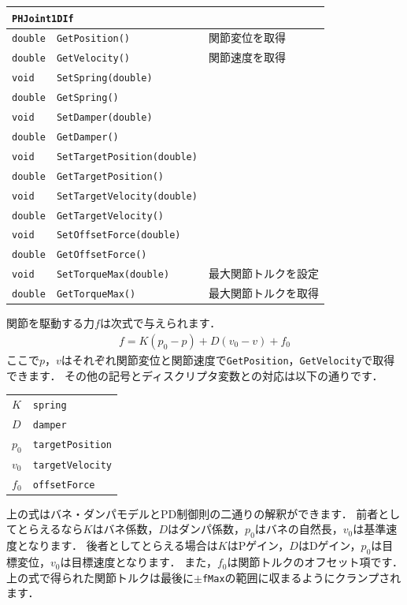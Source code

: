\begin{center}
\begin{longtable}{p{.15\hsize}p{.45\hsize}p{.30\hsize}}
\multicolumn{3}{l}{\texttt{PHJoint1DIf}}						\\ \midrule
\texttt{double}	& \texttt{GetPosition()}				& 関節変位を取得 \\
\texttt{double} & \texttt{GetVelocity()}				& 関節速度を取得 \\
\texttt{void} 	& \texttt{SetSpring(double)}			& \\
\texttt{double} & \texttt{GetSpring()}					& \\
\texttt{void} 	& \texttt{SetDamper(double)}			& \\
\texttt{double} & \texttt{GetDamper()}					& \\
\texttt{void} 	& \texttt{SetTargetPosition(double)}	& \\
\texttt{double} & \texttt{GetTargetPosition()}			& \\
\texttt{void} 	& \texttt{SetTargetVelocity(double)}	& \\
\texttt{double} & \texttt{GetTargetVelocity()}			& \\
\texttt{void} 	& \texttt{SetOffsetForce(double)}		& \\
\texttt{double} & \texttt{GetOffsetForce()}				& \\
\texttt{void} 	& \texttt{SetTorqueMax(double)}			& 最大関節トルクを設定 \\
\texttt{double} & \texttt{GetTorqueMax()}				& 最大関節トルクを取得 \\
\end{longtable}
\end{center}

\KLUDGE 関節を駆動する力$f$は次式で与えられます．
\begin{align*}
f = K(p_0 - p) + D(v_0 - v) + f_0
\end{align*}
\KLUDGE ここで$p$，$v$はそれぞれ関節変位と関節速度で\texttt{GetPosition}，\texttt{GetVelocity}で取得できます．
\KLUDGE その他の記号とディスクリプタ変数との対応は以下の通りです．
\begin{center}
\begin{tabular}{ll}
$K$		&	\texttt{spring}				\\
$D$		&	\texttt{damper}				\\
$p_0$	&	\texttt{targetPosition}		\\
$v_0$	&	\texttt{targetVelocity}		\\
$f_0$	&	\texttt{offsetForce}
\end{tabular}
\end{center}
\KLUDGE 上の式はバネ・ダンパモデルとPD制御則の二通りの解釈ができます．
\KLUDGE 前者としてとらえるなら$K$はバネ係数，$D$はダンパ係数，$p_0$はバネの自然長，$v_0$は基準速度となります．
\KLUDGE 後者としてとらえる場合は$K$はPゲイン，$D$はDゲイン，$p_0$は目標変位，$v_0$は目標速度となります．
\KLUDGE また，$f_0$は関節トルクのオフセット項です．
\KLUDGE 上の式で得られた関節トルクは最後に$\pm$\texttt{fMax}の範囲に収まるようにクランプされます．

